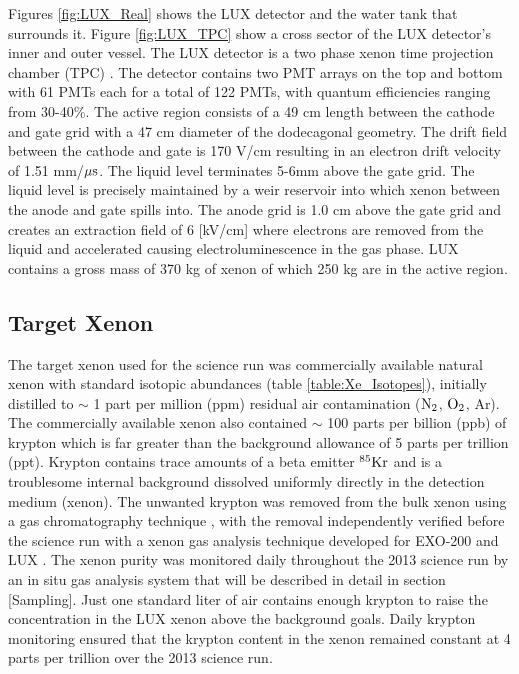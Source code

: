 Figures \ref{fig:LUX_Real} %
shows the LUX detector and the water tank that surrounds it.  Figure \ref{fig:LUX_TPC} show a cross sector of the LUX detector's inner and outer vessel. The LUX detector is a two phase xenon time projection chamber (TPC)  \cite{LUX_PRL}.  The detector contains two PMT arrays on the top and bottom with 61 PMTs each for a total of 122 PMTs, with quantum efficiencies ranging from 30-40\%. The active region consists of a 49 cm length between the cathode and gate grid with a 47 cm diameter of the dodecagonal geometry. The drift field between the cathode and gate is 170 V/cm resulting in an electron drift velocity of 1.51 mm/$\rm \mu s$. The liquid level terminates 5-6mm above the gate grid. The liquid level is precisely maintained by a weir reservoir into which xenon between the anode and gate spills into. The anode grid is 1.0 cm above the gate grid and creates an extraction field of 6 [kV/cm] where electrons are removed from the liquid and accelerated causing electroluminescence in the gas phase.  LUX contains a gross mass of 370 kg of xenon of which 250 kg are in the active region.  

\subsection{Target Xenon}
The target xenon used for the science run was commercially available natural xenon with standard isotopic abundances (table \ref{table:Xe_Isotopes}), initially distilled to $\sim$ 1 part per million (ppm) residual air contamination ($\rm N_2$, $\rm O_2$, Ar). The commercially available xenon also contained $\sim$ 100 parts per billion (ppb) of krypton which is far greater than the background allowance of 5 parts per trillion (ppt). Krypton contains trace amounts of a beta emitter $\rm ^{85}Kr$ and is a troublesome internal background dissolved uniformly directly in the detection medium (xenon). The unwanted krypton was removed from the bulk xenon using a gas chromatography technique \cite{lux_kr_removal}, with the removal independently verified before the science run with a xenon gas analysis technique developed for EXO-200 and LUX \cite{Kr_ppt_Dobi}. The xenon purity was monitored daily throughout the 2013 science run by an in situ gas analysis system that will be described in detail in section [Sampling]. Just one standard liter of air contains enough krypton to raise the concentration in the LUX xenon above the background goals. Daily krypton monitoring ensured that the krypton content in the xenon remained constant at 4 parts per trillion over the 2013 science run\cite{LUX_BG}.


